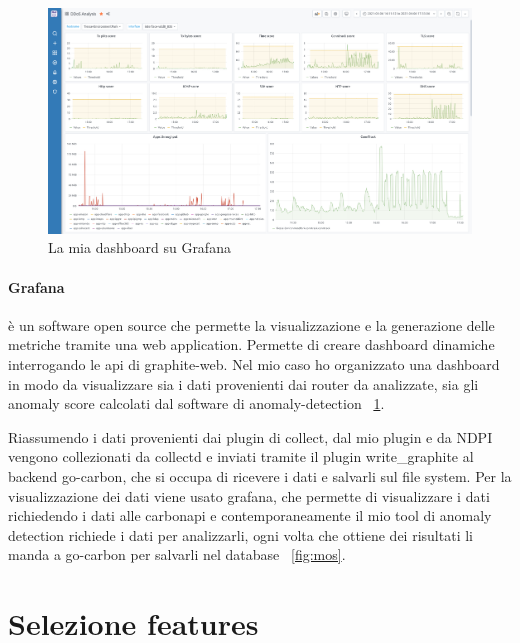 \begin{figure}[h]
    \label{fig:graphana}
    \includegraphics[width=\hsize]{images/my_work/grafana_dashboard.png}
    \caption{La mia dashboard su Grafana}
    \centering
\end{figure}

\paragraph{Grafana} è un software open source che permette la visualizzazione e la generazione delle metriche tramite una web application. Permette di creare dashboard dinamiche interrogando le api di graphite-web. Nel mio caso ho organizzato una dashboard in modo da visualizzare sia i dati provenienti dai router da analizzate, sia gli anomaly score calcolati dal software di anomaly-detection ~\ref{fig:graphana}.


Riassumendo i dati provenienti dai plugin di collect, dal mio plugin e da NDPI vengono collezionati da collectd e inviati tramite il plugin write\_graphite al backend go-carbon, che si occupa di ricevere i dati e salvarli sul file system. Per la visualizzazione dei dati viene usato grafana, che permette di visualizzare i dati richiedendo i dati alle carbonapi e contemporaneamente il mio tool di anomaly detection richiede i dati per analizzarli, ogni volta che ottiene dei risultati li manda a go-carbon per salvarli nel database ~\ref{fig:mos}.


\section{Selezione features}

